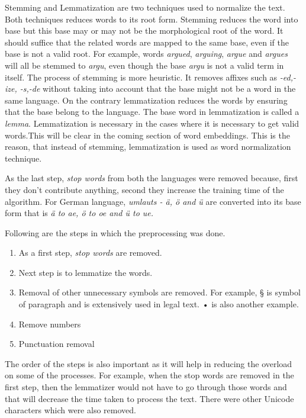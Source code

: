 Stemming and Lemmatization are two techniques used to normalize the text. Both techniques reduces words to its root form. Stemming reduces the word into base but this base may or may not be the morphological root of the word. It should suffice that the related words are mapped to the same base, even if the base is not a valid root. For example, words \textit{argued}, \textit{arguing}, \textit{argue} and \textit{argues} will all be stemmed to \textit{argu}, even though the base \textit{argu} is not a valid term in itself. The process of stemming is more heuristic. It removes affixes such as \textit{-ed,-ize, -s,-de} without taking into account that the base might not be a word in the same language. On the contrary lemmatization reduces the words by ensuring that the base belong to the language. The base word in lemmatization is called a \textit{lemma}. Lemmatization is necessary in the cases where it is necessary to get valid words.This will be clear in the coming section of word embeddings. This is the reason, that instead of stemming, lemmatization is used as word normalization technique.  

As the last step, \textit{stop words} from both the languages were removed because, first they don't contribute anything, second they increase the training time of the algorithm. For German language, \textit{umlauts - ä, ö and ü} are converted into its base form that is \textit{ä to ae, ö to oe and ü to ue.}

Following are the steps in which the preprocessing was done.

\begin{enumerate}
    \item As a first step, \textit{stop words} are removed.
    \item Next step is to lemmatize the words.
    \item Removal of other unnecessary symbols are removed. For example, § is symbol of paragraph and is extensively used in legal text. • is also another example.
    \item Remove numbers
    \item Punctuation removal
\end{enumerate}

The order of the steps is also important as it will help in reducing the overload on some of the processes. For example, when the stop words are removed in the first step, then the lemmatizer would not have to go through those words and that will decrease the time taken to process the text. There were other Unicode characters which were also removed. 

